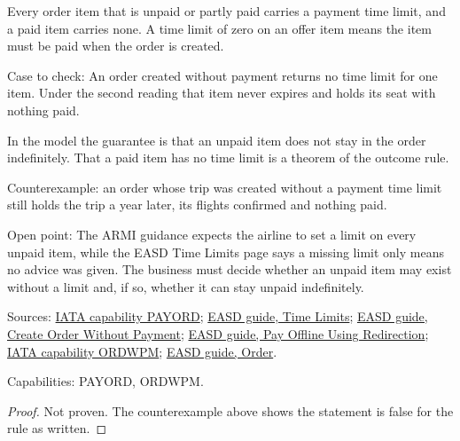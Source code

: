 \begin{theorem}
  \label{thm:payment-time-limit-on-unpaid}
  Every order item that is unpaid or partly paid carries a payment time
  limit, and a paid item carries none. A time limit of zero on an offer item
  means the item must be paid when the order is created.

  Case to check: An order created without payment returns no time limit for
  one item. Under the second reading that item never expires and holds its
  seat with nothing paid.

  In the model the guarantee is that an unpaid item does not stay in the
  order indefinitely.  That a paid item has no time limit is a theorem of the
  outcome rule.

  Counterexample: an order whose trip was created without a payment time
  limit still holds the trip a year later, its flights confirmed and nothing
  paid.

  Open point: The ARMI guidance expects the airline to set a limit on every
  unpaid item, while the EASD Time Limits page says a missing limit only
  means no advice was given. The business must decide whether an unpaid item
  may exist without a limit and, if so, whether it can stay unpaid
  indefinitely.

  Sources: \href{https://retailing.iata.org/armi/docs/PAYORD/}{IATA capability PAYORD};
  \href{https://standards.atlassian.net/wiki/spaces/EASD/pages/574423066/Time+Limits}{EASD guide, Time Limits};
  \href{https://standards.atlassian.net/wiki/spaces/EASD/pages/574455879/Create+Order+Without+Payment}{EASD guide, Create Order Without Payment};
  \href{https://standards.atlassian.net/wiki/spaces/EASD/pages/574455927/Pay+Offline+Using+Redirection}{EASD guide, Pay Offline Using Redirection};
  \href{https://retailing.iata.org/armi/docs/ORDWPM/}{IATA capability ORDWPM};
  \href{https://standards.atlassian.net/wiki/spaces/EASD/pages/574849062/Order}{EASD guide, Order}.

  Capabilities: PAYORD, ORDWPM.
\end{theorem}
\begin{proof}
  Not proven.  The counterexample above shows the statement is false for the
  rule as written.
\end{proof}

